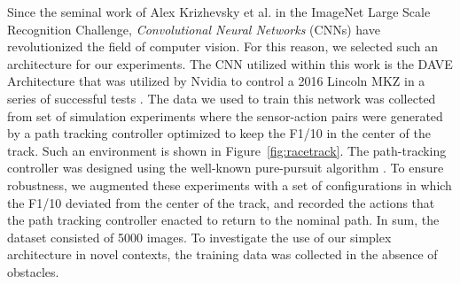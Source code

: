 \documentclass[manuscript,screen,review]{acmart}
\begin{document}





Since the seminal work of Alex Krizhevsky et al. \cite{AlexNet2012} in the ImageNet Large Scale Recognition Challenge, \emph{Convolutional Neural Networks} (CNNs) have revolutionized the field of computer vision. For this reason, we selected such an architecture for our experiments. The CNN utilized within this work is the DAVE Architecture that was utilized by Nvidia to control a 2016 Lincoln MKZ in a series of successful tests \cite{bojarski2016end}. The data we used to train this network was collected from set of simulation experiments where the sensor-action pairs were generated by a path tracking controller optimized to keep the F1/10 in the center of the track. Such an environment is shown in Figure~\ref{fig:racetrack}. The path-tracking controller was designed using the well-known pure-pursuit algorithm \cite{coulter1992implementation}. To ensure robustness, we augmented these experiments with a set of configurations in which the F1/10 deviated from the center of the track, and recorded the actions that the path tracking controller enacted to return to the nominal path. In sum, the dataset consisted of 5000 images.  To investigate the use of our simplex architecture in novel contexts, the training data was collected in the absence of obstacles.
\end{document}
